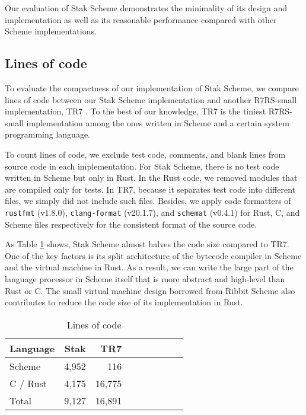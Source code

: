 \documentclass[sigplan]{acmart}
\begin{document}
Our evaluation of Stak Scheme demonstrates the minimality of its design and
implementation as well as its reasonable performance compared with
other Scheme implementations.

\subsection{Lines of code}

To evaluate the compactness of our implementation of Stak Scheme,
we compare lines of code between our Stak Scheme implementation and
another R7RS-small implementation, TR7 \cite{tr7}.
To the best of our knowledge, TR7 is the tiniest R7RS-small implementation
among the ones written in Scheme and a certain system programming language.

To count lines of code, we exclude test code, comments, and blank
lines from source code in each implementation.
For Stak Scheme, there is no test code written in Scheme but only in Rust.
In the Rust code, we removed modules that are compiled only for tests.
In TR7, because it separates test code into different files, we simply did not
include such files.
Besides, we apply code formatters of \texttt{rustfmt} (v1.8.0),
\texttt{clang-format} (v20.1.7), and \texttt{schemat} (v0.4.1) for
Rust, C, and Scheme files respectively for the consistent format of
the source code.

As Table \ref{table:loc} shows, Stak Scheme almost
halves the code size compared to TR7.
One of the key factors is its split architecture of the bytecode
compiler in Scheme and the virtual machine in Rust.
As a result, we can write the large part of the language processor in Scheme
itself that is more abstract and high-level than Rust or C.
The small virtual machine design borrowed from Ribbit Scheme also
contributes to reduce the code size of its implementation in Rust.

\begin{table}
  \begin{center}
    \begin{tabular}{l|rrrrrrrr}
      \hline
      Language & Stak & TR7  \\
      \hline
      Scheme & 4,952 & 116 \\
      C / Rust & 4,175 & 16,775 \\
      Total & 9,127 & 16,891 \\
      \hline
    \end{tabular}

    \caption{Lines of code}
    \label{table:loc}
  \end{center}
\end{table}
\end{document}
